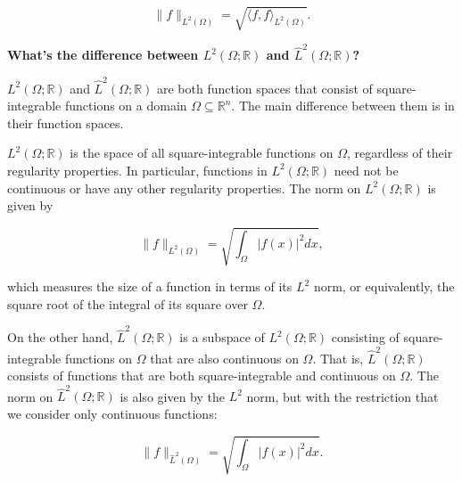 \documentclass[12pt]{article} %
\begin{document}
$$\|f\|_{L^2(\Omega)} = \sqrt{\langle f,f \rangle_{L^2(\Omega)}}.$$\par
 
 
 
\textbf{What's the difference between $L^2(\Omega; \mathbb{R})$ and $\hat{L}^2(\Omega; \mathbb{R})$?}\par
$L^2(\Omega; \mathbb{R})$ and $\hat{L}^2(\Omega; \mathbb{R})$ are both function spaces that consist of square-integrable functions on a domain $\Omega\subseteq \mathbb{R}^n$. The main difference between them is in their function spaces.

$L^2(\Omega; \mathbb{R})$ is the space of all square-integrable functions on $\Omega$, regardless of their regularity properties. In particular, functions in $L^2(\Omega; \mathbb{R})$ need not be continuous or have any other regularity properties. The norm on $L^2(\Omega; \mathbb{R})$ is given by

$$\|f\|_{L^2(\Omega)} = \sqrt{\int_{\Omega} |f(x)|^2 dx},$$

which measures the size of a function in terms of its $L^2$ norm, or equivalently, the square root of the integral of its square over $\Omega$.

On the other hand, $\hat{L}^2(\Omega; \mathbb{R})$ is a subspace of $L^2(\Omega; \mathbb{R})$ consisting of square-integrable functions on $\Omega$ that are also continuous on $\Omega$. That is, $\hat{L}^2(\Omega; \mathbb{R})$ consists of functions that are both square-integrable and continuous on $\Omega$. The norm on $\hat{L}^2(\Omega; \mathbb{R})$ is also given by the $L^2$ norm, but with the restriction that we consider only continuous functions:

$$\|f\|_{\hat{L}^2(\Omega)} = \sqrt{\int_{\Omega} |f(x)|^2 dx}.$$
\end{document}
